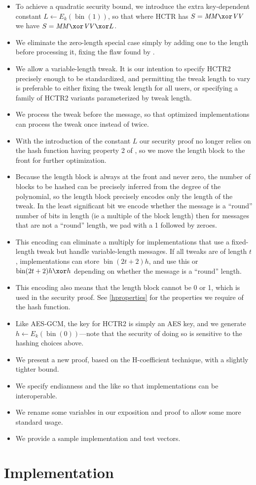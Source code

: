 \documentclass[letterpaper,11pt]{article}
\newcommand*{\MM}{\mathit{MM}}
\newcommand*{\VV}{\mathit{VV}}
\DeclareMathOperator{\fromint}{bin}
\begin{document}
\begin{itemize}
    \item To achieve a quadratic security bound, we introduce the extra
    key-dependent constant \(L \gets E_k(\fromint(1))\),
    so that where HCTR has \(S = \MM \xor \VV\)
    we have \(S = \MM \xor \VV \xor L\).
    \item We eliminate the zero-length special case simply by adding one to the 
    length before processing it, fixing the flaw found by \cite{kumarhctr}.
    \item We allow a variable-length tweak. It is our intention to specify
    HCTR2 precisely enough to be standardized, and permitting the tweak length
    to vary is preferable to either fixing the tweak length for all users,
    or specifying a family of HCTR2 variants parameterized by tweak length.
    \item We process the tweak before the message, so that optimized 
    implementations can process the tweak once instead of twice.
    \item With the introduction of the constant \(L\)
    our security proof no longer relies on the hash function
    having property 2 of \cite[Section~3.3]{hctr}, so
    we move the length block
    to the front for further optimization.
    \item Because the length block is always at the front and never zero, 
    the number of blocks to be hashed can be precisely inferred from the degree
    of the polynomial, so the length block precisely encodes only the length of 
    the tweak. In the least significant bit we encode whether the message
    is a ``round'' number of bits in length (ie a multiple of the block length)
    then for messages that are not a ``round'' length, we pad with a 1 followed
    by zeroes.
    \item This encoding can eliminate a multiply for implementations that use
    a fixed-length tweak but handle variable-length messages.
    If all tweaks are of length \(t\), implementations can store
    \(\fromint(2t + 2)h\), and use this or \(\fromint(2t + 2)h \xor h\)
    depending on whether the message is a ``round'' length.
    \item This encoding also means that the length block cannot be 0 or 1,
    which is used in the security proof.  See \autoref{hproperties}
    for the properties we require of the hash function.
    \item Like AES-GCM, the key for HCTR2 is simply an AES key, and we 
    generate \(h \gets E_k(\fromint(0))\)---note that the security of doing so is
    sensitive to the hashing choices above.
    \item We present a new proof, based on the H-coefficient technique, with a slightly tighter bound.
    \item We specify endianness and the like so that implementations can be interoperable.
    \item We rename some variables in our exposition and proof to allow some more standard usage.
    \item We provide a sample implementation and test vectors.
\end{itemize}

\section{Implementation}



\printbibliography[heading=bibintoc]
\end{document}
